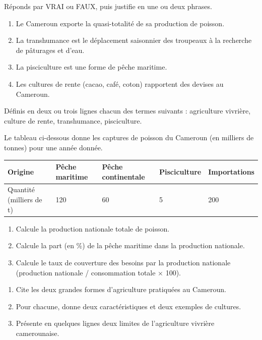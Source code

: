 \documentclass[11pt]{article}
\newcommand{\cle}[1]{{\popxbold\color{popdark}#1}}
\newcounter{popsec}
\newcounter{popsub}
\newcommand{\courssub}[1]{%
  \stepcounter{popsub}%
  \par\vspace{9pt}\noindent{\popxbold\fontsize{11.5}{13}\selectfont\color{popink}{\color{poporange}\thepopsec.\thepopsub}\hspace{6pt}#1}\par\nopagebreak\vspace{4pt}
}
\begin{document}
\begin{exercice}
Réponds par VRAI ou FAUX, puis justifie en une ou deux phrases.
\begin{enumerate}
\item Le Cameroun exporte la quasi-totalité de sa production de poisson.
\item La transhumance est le déplacement saisonnier des troupeaux à la recherche de pâturages et d'eau.
\item La pisciculture est une forme de pêche maritime.
\item Les cultures de rente (cacao, café, coton) rapportent des devises au Cameroun.
\end{enumerate}
\end{exercice}

\begin{exercice}[Définitions]
Définis en deux ou trois lignes chacun des termes suivants : \cle{agriculture vivrière}, \cle{culture de rente}, \cle{transhumance}, \cle{pisciculture}.
\end{exercice}

\begin{exercice}
Le tableau ci-dessous donne les captures de poisson du Cameroun (en milliers de tonnes) pour une année donnée.
\begin{center}
\begin{tabularx}{\linewidth}{|l|X|X|X|X|}
\hline
\rowcolor{popblueL} Origine & Pêche maritime & Pêche continentale & Pisciculture & Importations \\
\hline
Quantité (milliers de t) & 120 & 60 & 5 & 200 \\
\hline
\end{tabularx}
\end{center}
\begin{enumerate}
\item Calcule la production nationale totale de poisson.
\item Calcule la part (en \%) de la pêche maritime dans la production nationale.
\item Calcule le taux de couverture des besoins par la production nationale (production nationale / consommation totale $\times$ 100).
\end{enumerate}
\end{exercice}

\courssub{Je m'entraîne}

\begin{exercice}
\begin{enumerate}
\item Cite les deux grandes formes d'agriculture pratiquées au Cameroun.
\item Pour chacune, donne deux caractéristiques et deux exemples de cultures.
\item Présente en quelques lignes deux limites de l'agriculture vivrière camerounaise.
\end{enumerate}
\end{exercice}
\end{document}
